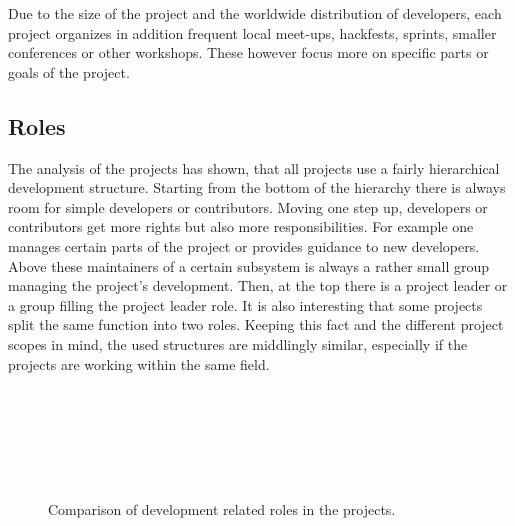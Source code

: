Due to the size of the project and the worldwide distribution of developers,
each project organizes in addition frequent local meet-ups, hackfests, sprints,
smaller conferences or other workshops. These however focus more on
specific parts or goals of the project.


\subsection{Roles} %

The analysis of the projects has shown, that all projects use a fairly
hierarchical development structure. Starting from the bottom of the hierarchy
there is always room for simple developers or contributors. Moving one step up,
developers or contributors get more rights but also more responsibilities. For
example one manages certain parts of the project or provides guidance to new
developers. Above these maintainers of a certain subsystem is always a rather
small group managing the project's development. Then, at the top there is a
project leader or a group filling the project leader role. It is also
interesting that some projects split the same function into two roles. Keeping
this fact and the different project scopes in mind, the used structures are
middlingly similar, especially if the projects are working within the same
field.

\begin{figure}[htbp]
  \centering
   \qquad
   \\

   \qquad
   \\

   \qquad
   \\

   \qquad
   \\

   \qquad
   \\
  \caption[Comparison of Development Related Roles]
  {Comparison of development related roles in the projects.}
\end{figure}

